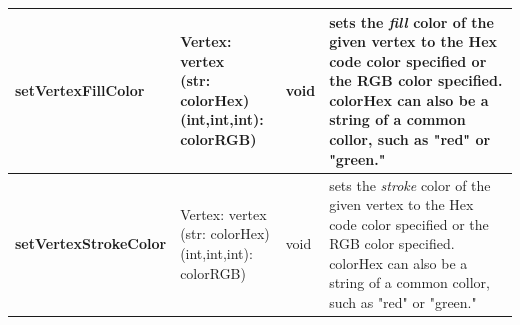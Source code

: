 \documentclass{article}
\newlength\q
\newlength\smallCol
\newlength\argsLen
\begin{document}
\begin{table}[h]
\begin{tabular}{m{\smallCol}m{\argsLen}m{\smallCol}m{\q}}
\textbf{setVertexFillColor} & \makecell{Vertex: vertex\\(str: colorHex)\\(int,int,int): colorRGB)} & void & sets the \textit{fill} color of the given vertex to the Hex code color specified or the RGB color specified. colorHex can also be a string of a common collor, such as "red" or "green."  \\ \hline
\textbf{setVertexStrokeColor} & \makecell{Vertex: vertex\\(str: colorHex)\\(int,int,int): colorRGB)} & void & sets the \textit{stroke} color of the given vertex to the Hex code color specified or the RGB color specified. colorHex can also be a string of a common collor, such as "red" or "green."  \\ \hline
\end{tabular}
\end{table}
\end{document}
